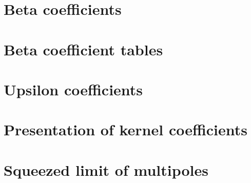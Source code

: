 \begin{appendices}
%
\chapter{Beta coefficients}
\label{app_betas}
%

%
\chapter{Beta coefficient tables}
\label{app_pnga}
%

%
\chapter{Upsilon coefficients}
\label{app_pngb}
%

%
% 
%
\chapter{Presentation of kernel coefficients}
\label{app_kernelpres}
%

%
\chapter{Squeezed limit of multipoles}
\label{app_sqlimmultip}
%

%
% 
%
% 
%
\end{appendices}

